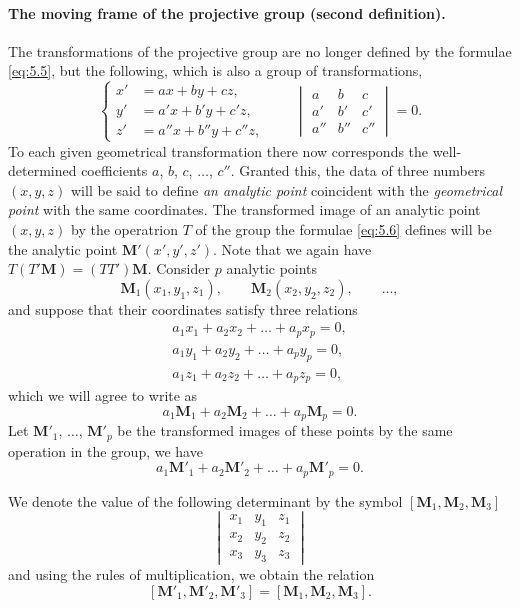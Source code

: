 \paragraph{The moving frame of the projective group (second definition).}
\label{sec:67}
The transformations of the projective group are no longer defined by the formulae \eqref{eq:5.5}, but the following, which is also a group of transformations,
\begin{equation}
  \label{eq:5.6}
  \left\{
    \begin{aligned}
      x'&=ax+by+cz,\\
      y'&=a'x+b'y+c'z,\\
      z'&=a''x+b''y+c''z,
    \end{aligned}
  \right.\qquad
  \begin{vmatrix}
    a&b&c\\
    a'&b'&c'\\
    a''&b''&c''
  \end{vmatrix}
  =0.
\end{equation}
To each given geometrical transformation there now corresponds the well-determined coefficients $a$, $b$, $c$, $\dots$, $c''$. Granted this, the data of three numbers $(x,y,z)$ will be said to define \emph{an analytic point} coincident with the \emph{geometrical point} with the same coordinates. The transformed image of an analytic point $(x,y,z)$ by the operatrion $T$ of the group the formulae \eqref{eq:5.6} defines will be the analytic point $\mathbf{M}'(x',y',z')$. Note that we again have $T(T'\mathbf{M})=(TT')\mathbf{M}$. Consider $p$ analytic points
\[
\mathbf{M}_{1}(x_{1},y_{1},z_{1}),\qquad \mathbf{M}_{2}(x_{2},y_{2},z_{2}),\qquad\dots,
\] 
and suppose that their coordinates satisfy three relations
\begin{align*}
  a_{1}x_{1}+a_{2}x_{2}+\dots+a_{p}x_{p}=0,\\
  a_{1}y_{1}+a_{2}y_{2}+\dots+a_{p}y_{p}=0,\\
  a_{1}z_{1}+a_{2}z_{2}+\dots+a_{p}z_{p}=0,
\end{align*}
which we will agree to write as
\[
  a_{1}\mathbf{M}_{1}+a_{2}\mathbf{M}_{2}+\dots+a_{p}\mathbf{M}_{p}=0.
\]
Let $\mathbf{M}'_{1}$, $\dots$, $\mathbf{M}'_{p}$ be the transformed images of these points by the same operation in the group, we have
\[
  a_{1}\mathbf{M}'_{1}+a_{2}\mathbf{M}'_{2}+\dots+a_{p}\mathbf{M}'_{p}=0.
\]

We denote the value of the following determinant by the symbol $[\mathbf{M}_{1},\mathbf{M}_{2},\mathbf{M}_{3}]$
\[
\begin{vmatrix}
  x_{1}&y_{1}&z_{1}\\
  x_{2}&y_{2}&z_{2}\\
  x_{3}&y_{3}&z_{3}
\end{vmatrix}
\]
and using the rules of multiplication, we obtain the relation
\[
[\mathbf{M}'_{1},\mathbf{M}'_{2},\mathbf{M}'_{3}]=[\mathbf{M}_{1},\mathbf{M}_{2},\mathbf{M}_{3}].
\]

